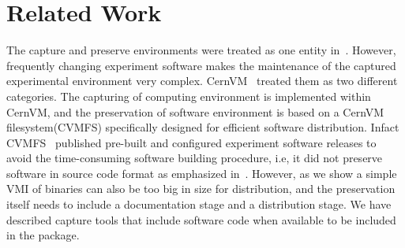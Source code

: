 \section{Related Work}


The capture and preserve environments were treated as one entity in~\cite{matthews2009towards,phelps2005no,hong2010software}. 
However, frequently changing experiment software makes the maintenance of the captured experimental environment very complex. 
CernVM~\cite{buncic2010cernvm} treated them as two different categories. 
The capturing of computing environment is implemented within CernVM, and the preservation of software environment is based on a CernVM filesystem(CVMFS) specifically designed for efficient software distribution.
Infact CVMFS~\cite{buncic2010cernvm} published pre-built and configured experiment software releases to avoid the time-consuming software building procedure, i.e, it did not 
preserve software in source code format as emphasized in~\cite{zabolitzky2002preserving,castagne2013consider}. 
However, as we show a simple VMI of binaries can also be too big in size for distribution, and the preservation itself needs to include a documentation stage and a distribution stage. 
We have described capture tools that include software code when available to be included in the package. 

